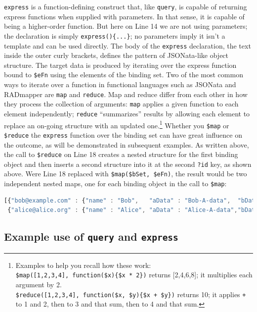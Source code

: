 \documentclass[10pt,letterpaper]{article} %
\newcommand{\stt}[1]{\texttt{#1}} %
\begin{document}
\stt{express} is a function-defining construct that, like \stt{query}, is capable of returning express functions when supplied with parameters.
In that sense, it is capable of being a higher-order function.
But here on Line 14 we are not using parameters; the declaration is simply \stt{express()\{...\}}; no parameters imply it isn't a template and can be used directly.
The body of the \stt{express} declaration, the text inside the outer curly brackets, defines the pattern of JSONata-like object structure.
The target data is produced by iterating over the express function bound to \stt{\$eFn} using the elements of the binding set.
Two of the most common ways to iterate over a function in functional languages such as JSONata and RADmapper are \stt{map} and \stt{reduce}.
Map and reduce differ from each other in how they process the collection of arguments:
\stt{map} applies a given function to each element independently;
\stt{reduce} ``summarizes'' results by allowing each element to replace an on-going structure with an updated one.\footnote{Examples to help you recall how these work:
  \\ \stt{\$map([1,2,3,4], function(\$x)\{\$x * 2\})} returns [2,4,6,8]; it multiplies each argument by 2.
  \\ \stt{\$reduce([1,2,3,4], function(\$x, \$y)\{\$x + \$y\})} returns 10; it applies \stt{+} to 1 and 2, then to 3 and that sum,
  then to 4 and that sum.}
Whether you \stt{\$map} or \stt{\$reduce} the \stt{express} function over the binding set can have great influence on the outcome, as will be demonstrated in subsequent examples.
As written above, the call to \stt{\$reduce} on Line 18 creates a nested structure for the first binding object and then inserts a second structure into it at the second \stt{?id} key, as shown above.
Were Line 18 replaced with \stt{\$map(\$bSet, \$eFn)}, the result would be two independent nested maps, one for each binding object in the call to \stt{\$map}:

\begin{lstlisting}[language=JavaScript,basicstyle=\ttfamily\scriptsize,numbers=none]
[{"bob@example.com" : {"name" : "Bob",   "aData" : "Bob-A-data",  "bData" : "Bob-B-data"  }},
 {"alice@alice.org" : {"name" : "Alice", "aData" : "Alice-A-data","bData" : "Alice-B-data"}}].
\end{lstlisting} \vspace{-2em}

\subsection{Example use of  \stt{query}  and  \stt{express} }
\end{document}
